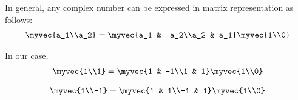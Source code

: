 \documentclass[journal,12pt,twocolumn]{IEEEtran}
\begin{document}
In general, any complex number can be expressed in matrix representation as follows:
\begin{align}
     \myvec{a_1\\a_2}= \myvec{a_1 & -a_2\\a_2 & a_1}\myvec{1\\0}
\end{align}

In our case, 
\begin{align}
\myvec{1\\1}= \myvec{1 & -1\\1 & 1}\myvec{1\\0}
\end{align}


\begin{align}
\myvec{1\\-1}= \myvec{1 & 1\\-1 & 1}\myvec{1\\0}
\end{align}
\end{document}
